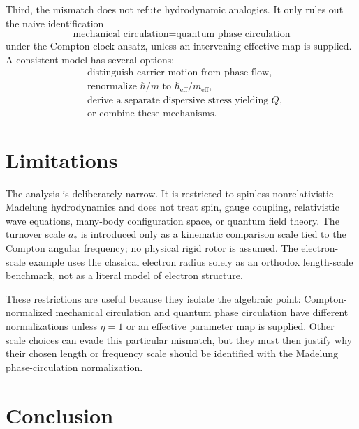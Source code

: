 \documentclass[11pt,a4paper]{article}
\newcommand{\aStar}{a_{*}}
\newcommand{\hbareff}{\hbar_{\mathrm{eff}}}
\newcommand{\meff}{m_{\mathrm{eff}}}
\begin{document}
Third, the mismatch does not refute hydrodynamic analogies. It only rules out the naive identification
\begin{equation}
    \text{mechanical circulation} = \text{quantum phase circulation}
\end{equation}
under the Compton-clock ansatz, unless an intervening effective map is supplied. A consistent model has several options:
\begin{align}
    &\text{distinguish carrier motion from phase flow,}\nonumber\\
    &\text{renormalize }\hbar/m\text{ to }\hbareff/\meff,\nonumber\\
    &\text{derive a separate dispersive stress yielding }Q,\nonumber\\
    &\text{or combine these mechanisms.}\nonumber
\end{align}

\section{Limitations}

The analysis is deliberately narrow. It is restricted to spinless nonrelativistic Madelung hydrodynamics and does not treat spin, gauge coupling, relativistic wave equations, many-body configuration space, or quantum field theory. The turnover scale $\aStar$ is introduced only as a kinematic comparison scale tied to the Compton angular frequency; no physical rigid rotor is assumed. The electron-scale example uses the classical electron radius solely as an orthodox length-scale benchmark, not as a literal model of electron structure.

These restrictions are useful because they isolate the algebraic point: Compton-normalized mechanical circulation and quantum phase circulation have different normalizations unless $\eta=1$ or an effective parameter map is supplied. Other scale choices can evade this particular mismatch, but they must then justify why their chosen length or frequency scale should be identified with the Madelung phase-circulation normalization.

\section{Conclusion}
\end{document}
